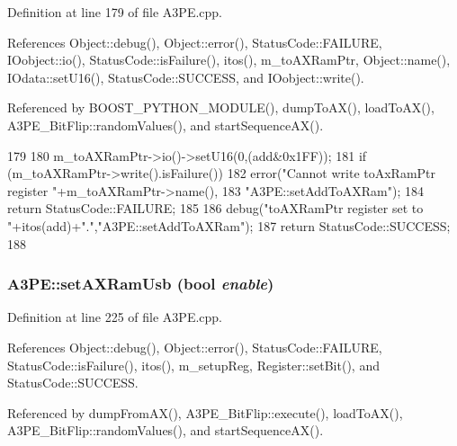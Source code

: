 Definition at line 179 of file A3PE.cpp.

References Object::debug(), Object::error(), StatusCode::FAILURE, IOobject::io(), StatusCode::isFailure(), itos(), m\_\-toAXRamPtr, Object::name(), IOdata::setU16(), StatusCode::SUCCESS, and IOobject::write().

Referenced by BOOST\_\-PYTHON\_\-MODULE(), dumpToAX(), loadToAX(), A3PE\_\-BitFlip::randomValues(), and startSequenceAX().


\begin{DoxyCode}
179                                      {
180   m_toAXRamPtr->io()->setU16(0,(add&0x1FF));
181   if (m_toAXRamPtr->write().isFailure()){
182     error("Cannot write toAxRamPtr register "+m_toAXRamPtr->name(),
183         "A3PE::setAddToAXRam");
184     return StatusCode::FAILURE;
185   }
186   debug("toAXRamPtr register set to "+itos(add)+".","A3PE::setAddToAXRam");
187   return StatusCode::SUCCESS;
188 }
\end{DoxyCode}
\hypertarget{classA3PE_a77ccfbd9df2fad96a9a9f1dc579a7a2d}{
\subsubsection[{setAXRamUsb}]{ A3PE::setAXRamUsb (bool {\em enable})}}
\label{classA3PE_a77ccfbd9df2fad96a9a9f1dc579a7a2d}


Definition at line 225 of file A3PE.cpp.

References Object::debug(), Object::error(), StatusCode::FAILURE, StatusCode::isFailure(), itos(), m\_\-setupReg, Register::setBit(), and StatusCode::SUCCESS.

Referenced by dumpFromAX(), A3PE\_\-BitFlip::execute(), loadToAX(), A3PE\_\-BitFlip::randomValues(), and startSequenceAX().


